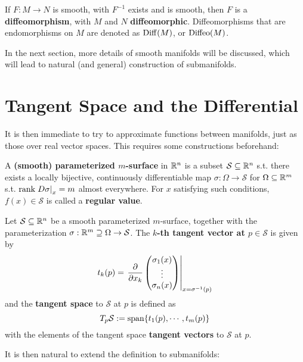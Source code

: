 \documentclass{article}
\begin{document}
\begin{definition}
    If $F: M \to N$ is smooth, with $F^{-1}$ exists and is smooth, then $F$ is a \textbf{diffeomorphism}, with $M$ and $N$ \textbf{diffeomorphic}. Diffeomorphisms that are endomorphisms on $M$ are denoted as $\mathrm{Diff}(M)$, or $\mathrm{Diffeo}(M)$.
\end{definition}

In the next section, more details of smooth manifolds will be discussed, which will lead to natural (and general) construction of submanifolds.

\section{Tangent Space and the Differential}

It is then immediate to try to approximate functions between manifolds, just as those over real vector spaces. This requires some constructions beforehand:

\begin{definition}
    A \textbf{(smooth) parameterized $m$-surface} in $\mathbb{R}^n$ is a subset $\mathcal{S} \subseteq \mathbb{R}^n$ s.t. there exists a locally bijective, continuously differentiable map $\sigma: \Omega \to \mathcal{S}$ for $\Omega \subseteq \mathbb{R}^m$ s.t. $\mathrm{rank} \left.D\sigma\right|_{x} = m$ almost everywhere. For $x$ satisfying such conditions, $f(x) \in \mathcal{S}$ is called a \textbf{regular value}.
\end{definition}

\begin{definition}
    Let $\mathcal{S} \subseteq \mathbb{R}^n$ be a smooth parameterized $m$-surface, together with the parameterization $\sigma: \mathbb{R}^m \supseteq \Omega \to \mathcal{S}$. The \textbf{$k$-th tangent vector at $p \in \mathcal{S}$} is given by
    \[
        t_k(p) = \left.\frac{\partial}{\partial x_k} \begin{pmatrix} \sigma_1(x) \\ \vdots \\ \sigma_n(x) \end{pmatrix}\right|_{x = \sigma^{-1}(p)}
    \]
    and the \textbf{tangent space} to $\mathcal{S}$ at $p$ is defined as
    \[
        T_p \mathcal{S} := \mathrm{span}\{ t_1(p), \cdots, t_m(p)\}
    \]
    with the elements of the tangent space \textbf{tangent vectors} to $\mathcal{S}$ at $p$.
\end{definition}

It is then natural to extend the definition to submanifolds:
\end{document}

